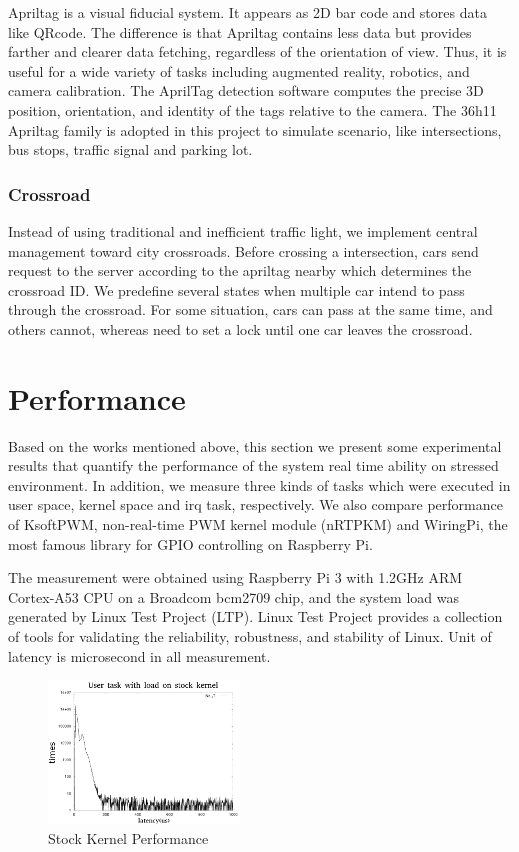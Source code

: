 \documentclass[conference]{IEEEtran}
\begin{document}
Apriltag is a visual fiducial system. It appears as 2D bar code and stores data like QRcode. The difference is that Apriltag contains less data but provides farther and clearer data fetching, regardless of the orientation of view. Thus, it is useful for a wide variety of tasks including augmented reality, robotics, and camera calibration. The AprilTag detection software computes the precise 3D position, orientation, and identity of the tags relative to the camera. The 36h11 Apriltag family is adopted in this project to simulate scenario, like intersections, bus stops, traffic signal and parking lot.

\subsubsection{Crossroad}

Instead of using traditional and inefficient traffic light, we implement central management toward city crossroads. Before crossing a intersection, cars send request to the server according to the apriltag nearby which determines the crossroad ID. We predefine several states when multiple car intend to pass through the crossroad. For some situation, cars can pass at the same time, and others cannot, whereas need to set a lock until one car leaves 	the crossroad.

\section{Performance}

Based on the works mentioned above, this section we present some experimental results that quantify the performance of the system real time ability on stressed environment. In addition, we measure three kinds of tasks which were executed in user space, kernel space and irq task, respectively. We also compare performance of KsoftPWM, non-real-time PWM kernel module (nRTPKM) and WiringPi, the most famous library for GPIO controlling on Raspberry Pi.

	The measurement were obtained using Raspberry Pi 3 with 1.2GHz ARM Cortex-A53 CPU on a Broadcom bcm2709 chip, and the system load was generated by Linux Test Project (LTP). Linux Test Project provides a collection of tools for validating the reliability, robustness, and stability of Linux. Unit of latency is microsecond in all measurement.

\begin{figure}	
	\centering
	\includegraphics[width=2in]{img/stock_kernel.png}
	\caption{Stock Kernel Performance}
	\label{fig:stock_kernel_perf}
\end{figure}
\end{document}
